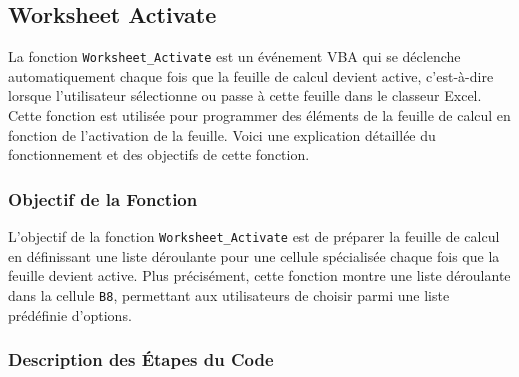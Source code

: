 \documentclass[a4paper, oneside, 12pt, final]{extreport}
\begin{document}
\subsection{Worksheet Activate}

La fonction \texttt{Worksheet\_Activate} est un événement VBA qui se déclenche automatiquement chaque fois que la feuille de calcul devient active, c'est-à-dire lorsque l'utilisateur sélectionne ou passe à cette feuille dans le classeur Excel. Cette fonction est utilisée pour programmer des éléments de la feuille de calcul en fonction de l'activation de la feuille. Voici une explication détaillée du fonctionnement et des objectifs de cette fonction.

\subsubsection{Objectif de la Fonction}

L'objectif de la fonction \texttt{Worksheet\_Activate} est de préparer la feuille de calcul en définissant une liste déroulante pour une cellule spécialisée chaque fois que la feuille devient active. Plus précisément, cette fonction montre une liste déroulante dans la cellule \texttt{B8}, permettant aux utilisateurs de choisir parmi une liste prédéfinie d'options.

\subsubsection{Description des Étapes du Code}
\end{document}
